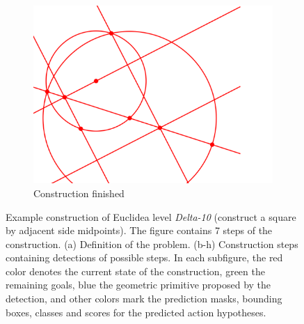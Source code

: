 \begin{figure}[!htb]
\begin{subfigure}[t]{0.32\textwidth}
         \centering
         \includegraphics[width=\textwidth]{img/Delta-10_example/input_image7.png}
         \caption{Construction finished}
         \label{fig:Epsilon12_example_fin}
     \end{subfigure}
     \hfill
     
        \caption{Example construction of Euclidea level \textit{Delta-10} (construct a square by adjacent side midpoints). The figure contains 7 steps of the construction. (a) Definition of the problem. (b-h) Construction steps containing \maskrcnn detections of possible steps. In each subfigure, the red color denotes the current state of the construction, green the remaining goals,
        blue the geometric primitive proposed by the detection,
        and other
        colors mark the prediction masks, bounding boxes, classes and scores for the predicted action hypotheses.
        }
        \label{fig:Delta10_example}
\end{figure}
\newpage
